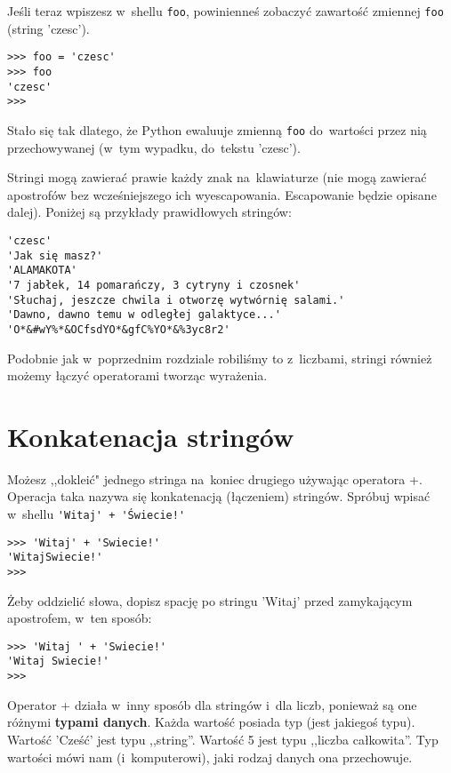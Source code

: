 \documentclass{book}
\begin{document}
Jeśli teraz wpiszesz w~shellu \lstinline{foo}, powinienneś zobaczyć zawartość zmiennej \lstinline{foo} (string 'czesc'). 


\begin{lstlisting}
>>> foo = 'czesc'
>>> foo
'czesc'
>>>
\end{lstlisting}

Stało się tak dlatego, że Python ewaluuje zmienną \lstinline{foo} do~wartości przez nią przechowywanej (w~tym wypadku, do~tekstu 'czesc').

Stringi mogą zawierać prawie każdy znak na~klawiaturze (nie mogą zawierać apostrofów bez wcześniejszego ich wyescapowania. Escapowanie będzie opisane dalej). Poniżej są przykłady prawidłowych stringów:

\begin{lstlisting}
'czesc'
'Jak się masz?'
'ALAMAKOTA'
'7 jabłek, 14 pomarańczy, 3 cytryny i czosnek'
'Słuchaj, jeszcze chwila i otworzę wytwórnię salami.'
'Dawno, dawno temu w odległej galaktyce...'
'O*&#wY%*&OCfsdYO*&gfC%YO*&%3yc8r2'
\end{lstlisting}

Podobnie jak w~poprzednim rozdziale robiliśmy to z~liczbami, stringi również możemy łączyć operatorami tworząc wyrażenia.

\section{Konkatenacja stringów}

Możesz ,,dokleić" jednego stringa na~koniec drugiego używając operatora +. Operacja taka nazywa się konkatenacją (łączeniem) stringów. Spróbuj wpisać w~shellu \lstinline{'Witaj' + 'Świecie!'}

\begin{lstlisting}
>>> 'Witaj' + 'Swiecie!'
'WitajSwiecie!'
>>>
\end{lstlisting}

Żeby oddzielić słowa, dopisz spację po stringu 'Witaj' przed zamykającym apostrofem, w~ten sposób:

\begin{lstlisting}
>>> 'Witaj ' + 'Swiecie!'
'Witaj Swiecie!'
>>> 
\end{lstlisting}

Operator + działa w~inny sposób dla stringów i~dla liczb, ponieważ są one różnymi {\bf typami danych}. Każda wartość posiada typ (jest jakiegoś typu). Wartość 'Cześć' jest typu ,,string''. Wartość 5 jest typu ,,liczba całkowita''. Typ wartości mówi nam (i~komputerowi), jaki rodzaj danych ona przechowuje. 
\end{document}
